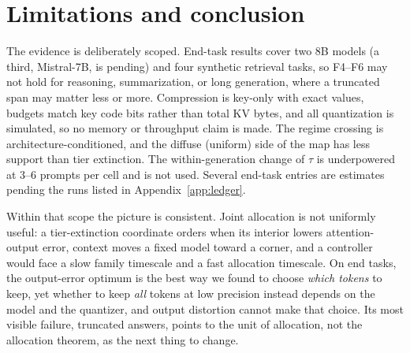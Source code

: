 \documentclass{article}
\theoremstyle{definition}
\begin{document}
\section{Limitations and conclusion}
\label{sec:conclusion}

The evidence is deliberately scoped.  End-task results cover two 8B models (a third, Mistral-7B, is pending) and four synthetic retrieval tasks, so F4--F6 may not hold for reasoning, summarization, or long generation, where a truncated span may matter less or more.  Compression is key-only with exact values, budgets match key code bits rather than total KV bytes, and all quantization is simulated, so no memory or throughput claim is made.  The regime crossing is architecture-conditioned, and the diffuse (uniform) side of the map has less support than tier extinction.  The within-generation change of $\tau$ is underpowered at 3--6 prompts per cell and is not used.  Several end-task entries are estimates pending the runs listed in Appendix~\ref{app:ledger}.

Within that scope the picture is consistent.  Joint allocation is not uniformly useful: a tier-extinction coordinate orders when its interior lowers attention-output error, context moves a fixed model toward a corner, and a controller would face a slow family timescale and a fast allocation timescale.  On end tasks, the output-error optimum is the best way we found to choose \emph{which tokens} to keep, yet whether to keep \emph{all} tokens at low precision instead depends on the model and the quantizer, and output distortion cannot make that choice.  Its most visible failure, truncated answers, points to the unit of allocation, not the allocation theorem, as the next thing to change.

\label{main:end}



\clearpage
\appendix

\end{document}
